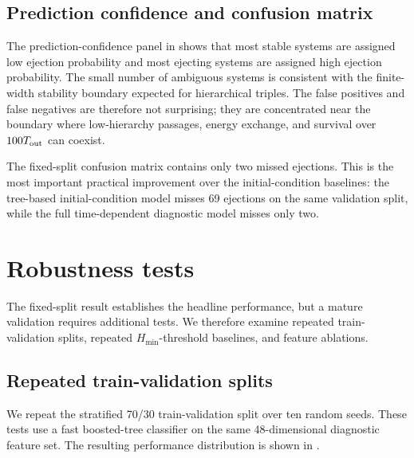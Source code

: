 \documentclass[12pt,a4paper]{article}
\newcommand{\Hmin}{H_{\min}}
\newcommand{\Tout}{T_{\rm out}}
\begin{document}
\subsection{Prediction confidence and confusion matrix}
\label{sec:confidence_confusion}

The prediction-confidence panel in  shows that most stable systems are assigned low ejection probability and most ejecting systems are assigned high ejection probability. The small number of ambiguous systems is consistent with the finite-width stability boundary expected for hierarchical triples. The false positives and false negatives are therefore not surprising; they are concentrated near the boundary where low-hierarchy passages, energy exchange, and survival over \(100\Tout\) can coexist.

The fixed-split confusion matrix contains only two missed ejections. This is the most important practical improvement over the initial-condition baselines: the tree-based initial-condition model misses 69 ejections on the same validation split, while the full time-dependent diagnostic model misses only two.

\section{Robustness tests}
\label{sec:robustness}

The fixed-split result establishes the headline performance, but a mature validation requires additional tests. We therefore examine repeated train-validation splits, repeated \(\Hmin\)-threshold baselines, and feature ablations.

\subsection{Repeated train-validation splits}
\label{sec:repeated_splits}

We repeat the stratified 70/30 train-validation split over ten random seeds. These tests use a fast boosted-tree classifier on the same 48-dimensional diagnostic feature set. The resulting performance distribution is shown in .
\end{document}
